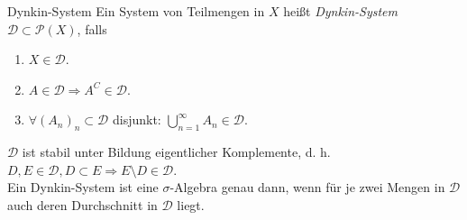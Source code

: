 \begin{karte}{Dynkin-System}
	Ein System von Teilmengen in \(X\) heißt 
	\textit{Dynkin-System} \(\mathcal{D} \subset \mathcal{P}(X)\), falls 
	\begin{enumerate}
		\item \(X \in \mathcal{D}\).
		\item \( A \in \mathcal{D} \Rightarrow A^C \in \mathcal{D} \).
		\item \( \forall (A_n)_n \subset \mathcal{D} \) disjunkt: \( \bigcup_{n=1}^\infty A_n \in \mathcal{D} \).
	\end{enumerate}
	\( \mathcal{D} \) ist stabil unter Bildung eigentlicher Komplemente, d. h. \( D,E \in \mathcal{D}, D \subset E \Rightarrow E \setminus D \in \mathcal{D} \).\\
	Ein Dynkin-System ist eine \(\sigma\)-Algebra genau 
	dann, wenn für je zwei Mengen in \(\mathcal{D}\) auch 
	deren Durchschnitt in \( \mathcal{D} \) liegt.
\end{karte}